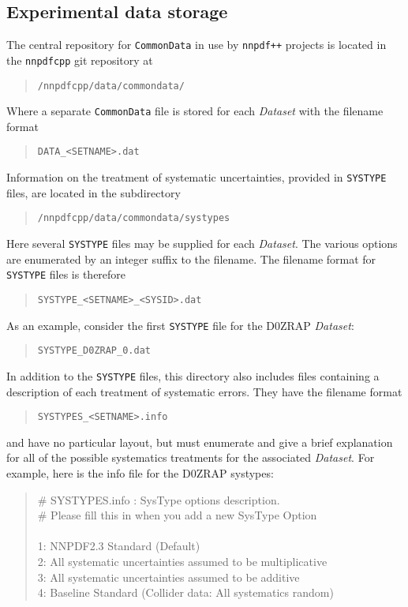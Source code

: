 \documentclass[11pt]{article}
\begin{document}
\subsection{Experimental data storage}
The central repository for {\tt CommonData} in use by {\tt nnpdf++} projects is located in the {\tt nnpdfcpp} git repository at
\begin{quotation}
    {\tt /nnpdfcpp/data/commondata/}
\end{quotation}
Where a separate {\tt CommonData} file is stored for each {\it Dataset} with the filename format
\begin{quotation}
	{\tt DATA\_<SETNAME>.dat }
\end{quotation}
Information on the treatment of systematic uncertainties, provided in {\tt SYSTYPE} files, are located in the subdirectory
\begin{quotation}
    {\tt /nnpdfcpp/data/commondata/systypes}
\end{quotation}
Here several {\tt SYSTYPE} files may be supplied for each {\it Dataset}. The various options are enumerated by an integer suffix to the filename. The filename format for {\tt SYSTYPE} files is therefore
\begin{quotation}
	{\tt SYSTYPE\_<SETNAME>\_<SYSID>.dat }
\end{quotation}
As an example, consider the first {\tt SYSTYPE} file for the D0ZRAP {\it Dataset}:
\begin{quotation}
	{\tt SYSTYPE\_D0ZRAP\_0.dat }
\end{quotation}
In addition to the {\tt SYSTYPE} files, this directory also includes files containing a description of each treatment of systematic errors. They have the filename format
\begin{quotation}
	{\tt SYSTYPES\_<SETNAME>.info }
\end{quotation}
and have no particular layout, but must enumerate and give a brief explanation for all of the possible systematics treatments for the associated {\it Dataset}. For example, here is the info file for the D0ZRAP systypes:
\begin{quotation}\noindent
\# SYSTYPES.info : SysType options description.\\
\# Please fill this in when you add a new SysType Option\\
\\
1: NNPDF2.3 Standard (Default)\\
2: All systematic uncertainties assumed to be multiplicative\\
3: All systematic uncertainties assumed to be additive\\
4: Baseline Standard (Collider data: All systematics random)
\end{quotation}
\end{document}

